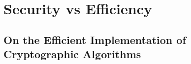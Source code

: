 \section{Security vs Efficiency}\label{sec:appendix:programming_languages_security_vs_efficiency}
\vspace{7.5cm}




\subsection{On the Efficient Implementation of Cryptographic Algorithms}\label{sec:security_of_cryptographic_algorithms:performance}




